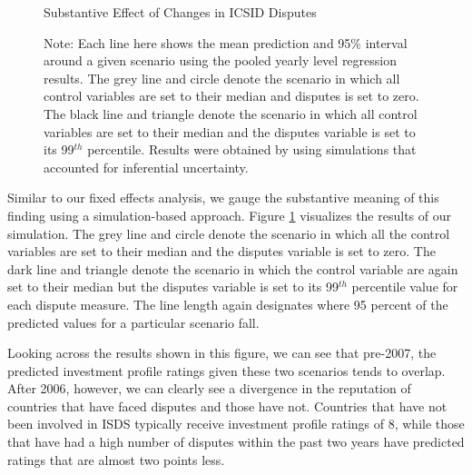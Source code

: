 \documentclass[12pt,onesided]{amsart}
\begin{document}
\begin{figure}[ht]
	\centering
	\caption{Substantive Effect of Changes in ICSID Disputes}
	\label{fig:dispEffectYearSim}
	\resizebox{1\textwidth}{!}{}
	\caption*{Note: Each line here shows the mean prediction and 95\% interval around a given scenario using the pooled yearly level regression results. The grey line and circle denote the scenario in which all control variables are set to their median and disputes is set to zero. The black line and triangle denote the scenario in which all control variables are set to their median and the disputes variable is set to its 99$^{th}$ percentile. Results were obtained by using simulations that accounted for inferential uncertainty. }
\end{figure}
\FloatBarrier

Similar to our fixed effects analysis, we gauge the substantive meaning of this finding using a simulation-based approach. Figure \ref{fig:dispEffectYearSim} visualizes the results of our simulation. The grey line and circle denote the scenario in which all the control variables are set to their median and the disputes variable is set to zero. The dark line and triangle denote the scenario in which the control variable are again set to their median but the disputes variable is set to its 99$^{th}$ percentile value for each dispute measure. The line length again designates where 95 percent of the predicted values for a particular scenario fall. 

Looking across the results shown in this figure, we can see that pre-2007, the predicted investment profile ratings given these two scenarios tends to overlap. After 2006, however, we can clearly see a divergence in the reputation of countries that have faced disputes and those have not. Countries that have not been involved in ISDS typically receive investment profile ratings of 8, while those that have had a high number of disputes within the past two years have predicted ratings that are almost two points less. 
\end{document}
